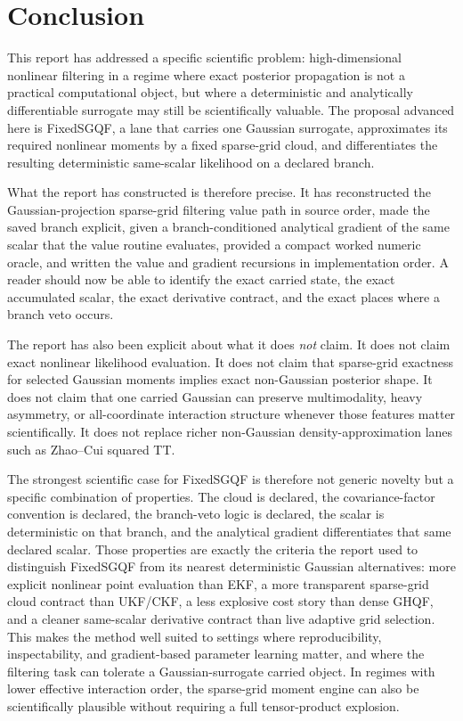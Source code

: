 \documentclass[11pt]{article}
\numberwithin{equation}{section}
\begin{document}
\section{Conclusion}
\label{sec:p31-conclusion}

This report has addressed a specific scientific problem: high-dimensional
nonlinear filtering in a regime where exact posterior propagation is not a
practical computational object, but where a deterministic and analytically
differentiable surrogate may still be scientifically valuable.  The proposal
advanced here is FixedSGQF, a lane that carries one Gaussian surrogate,
approximates its required nonlinear moments by a fixed sparse-grid cloud, and
differentiates the resulting deterministic same-scalar likelihood on a declared
branch.

What the report has constructed is therefore precise.  It has reconstructed the
Gaussian-projection sparse-grid filtering value path in source order, made the
saved branch explicit, given a branch-conditioned analytical gradient of the
same scalar that the value routine evaluates, provided a compact worked numeric
oracle, and written the value and gradient recursions in implementation order.
A reader should now be able to identify the exact carried state, the exact
accumulated scalar, the exact derivative contract, and the exact places where a
branch veto occurs.

The report has also been explicit about what it does \emph{not} claim.  It does
not claim exact nonlinear likelihood evaluation.  It does not claim that
sparse-grid exactness for selected Gaussian moments implies exact non-Gaussian
posterior shape.  It does not claim that one carried Gaussian can preserve
multimodality, heavy asymmetry, or all-coordinate interaction structure whenever
those features matter scientifically.  It does not replace richer non-Gaussian
density-approximation lanes such as Zhao--Cui squared TT.

The strongest scientific case for FixedSGQF is therefore not generic novelty but
a specific combination of properties.  The cloud is declared, the
covariance-factor convention is declared, the branch-veto logic is declared, the
scalar is deterministic on that branch, and the analytical gradient
differentiates that same declared scalar.  Those properties are exactly the
criteria the report used to distinguish FixedSGQF from its nearest deterministic
Gaussian alternatives: more explicit nonlinear point evaluation than EKF, a more
transparent sparse-grid cloud contract than UKF/CKF, a less explosive cost story
than dense GHQF, and a cleaner same-scalar derivative contract than live adaptive
grid selection.  This makes the method well suited to settings where
reproducibility, inspectability, and gradient-based parameter learning matter,
and where the filtering task can tolerate a Gaussian-surrogate carried object.
In regimes with lower effective interaction order, the sparse-grid moment engine
can also be scientifically plausible without requiring a full tensor-product
explosion.
\end{document}
